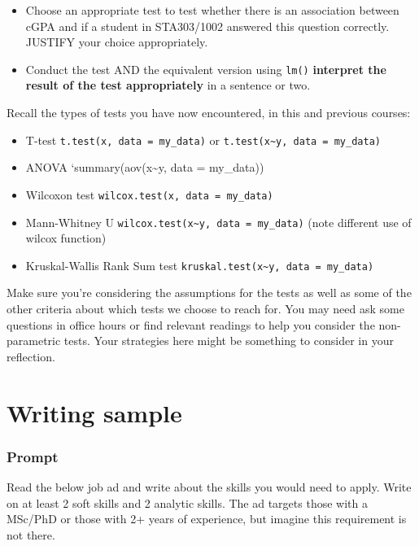 \documentclass[
  openany]{book}
\providecommand{\tightlist}{%
  \setlength{\itemsep}{0pt}\setlength{\parskip}{0pt}}
\begin{document}
\begin{itemize}
\item
  Choose an appropriate test to test whether there is an association between cGPA and if a student in STA303/1002 answered this question correctly. JUSTIFY your choice appropriately.
\item
  Conduct the test AND the equivalent version using \texttt{lm()} \textbf{interpret the result of the test appropriately} in a sentence or two.
\end{itemize}

Recall the types of tests you have now encountered, in this and previous courses:

\begin{itemize}
\tightlist
\item
  T-test \texttt{t.test(x,\ data\ =\ my\_data)} or \texttt{t.test(x\textasciitilde{}y,\ data\ =\ my\_data)}
\item
  ANOVA `summary(aov(x\textasciitilde y, data = my\_data))
\item
  Wilcoxon test \texttt{wilcox.test(x,\ data\ =\ my\_data)}
\item
  Mann-Whitney U \texttt{wilcox.test(x\textasciitilde{}y,\ data\ =\ my\_data)} (note different use of wilcox function)
\item
  Kruskal-Wallis Rank Sum test \texttt{kruskal.test(x\textasciitilde{}y,\ data\ =\ my\_data)}
\end{itemize}

Make sure you're considering the assumptions for the tests as well as some of the other criteria about which tests we choose to reach for. You may need ask some questions in office hours or find relevant readings to help you consider the non-parametric tests. Your strategies here might be something to consider in your reflection.

\hypertarget{writing-sample}{%
\section{Writing sample}\label{writing-sample}}

\hypertarget{prompt}{%
\subsubsection{Prompt}\label{prompt}}

Read the below job ad and write about the skills you would need to apply. Write on at least 2 soft skills and 2 analytic skills. The ad targets those with a MSc/PhD or those with 2+ years of experience, but imagine this requirement is not there.
\end{document}
